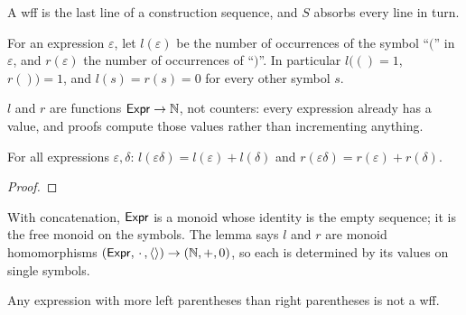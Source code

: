 \documentclass[11pt]{article}
\begin{document}
\begin{remark}[Idea]
A wff is the last line of a construction sequence, and $S$ absorbs every
line in turn.
\end{remark}

\begin{definition}\label{def:paren-counts}
For an expression $\varepsilon$, let $l(\varepsilon)$ be the number of
occurrences of the symbol ``$($'' in $\varepsilon$, and $r(\varepsilon)$ the
number of occurrences of ``$)$''. In particular $l(()=1$, $r())=1$, and
$l(s)=r(s)=0$ for every other symbol $s$.
\end{definition}

\begin{remark}
$l$ and $r$ are functions $\mathsf{Expr}\to\mathbb{N}$, not counters: every
expression already has a value, and proofs compute those values rather than
incrementing anything.
\end{remark}

\begin{lemma}\label{lem:counts-additive}
For all expressions $\varepsilon,\delta$:
$l(\varepsilon\delta)=l(\varepsilon)+l(\delta)$ and
$r(\varepsilon\delta)=r(\varepsilon)+r(\delta)$.
\end{lemma}

\begin{proof}
\end{proof}

\begin{remark}[Structure]
With concatenation, $\mathsf{Expr}$ is a monoid whose identity is the empty sequence;
it is the free monoid on the symbols. The lemma says $l$ and $r$ are monoid
homomorphisms $(\mathsf{Expr},\,\cdot\,,\langle\rangle)\to(\mathbb{N},+,0)$, so each
is determined by its values on single symbols.
\end{remark}

\begin{theorem}\label{thm:unbalanced-parens}
Any expression with more left parentheses than right parentheses is not a wff.
\end{theorem}

\begin{quantified}
\end{quantified}
\end{document}
